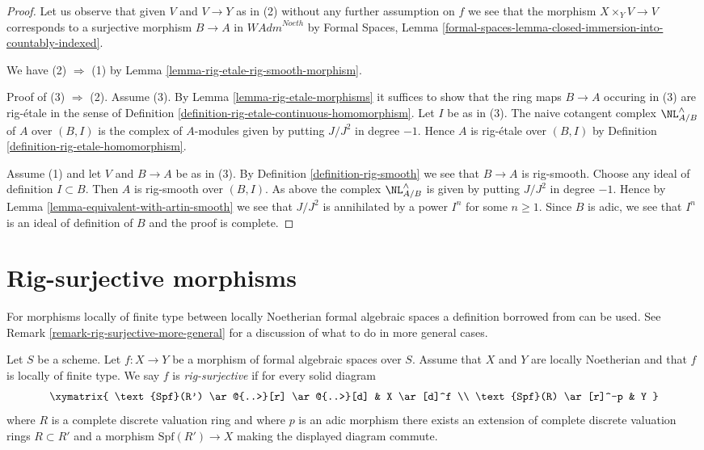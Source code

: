 \begin{proof}
Let us observe that given $V$ and $V \to Y$ as in (2) without any
further assumption on $f$ we see that the morphism $X \times_Y V \to V$
corresponds to a surjective morphism $B \to A$ in $\textit{WAdm}^{Noeth}$
by Formal Spaces, Lemma
\ref{formal-spaces-lemma-closed-immersion-into-countably-indexed}.

\medskip\noindent
We have (2) $\Rightarrow$ (1) by
Lemma \ref{lemma-rig-etale-rig-smooth-morphism}.

\medskip\noindent
Proof of (3) $\Rightarrow$ (2). Assume (3). By
Lemma \ref{lemma-rig-etale-morphisms}
it suffices to show that the ring maps
$B \to A$ occuring in (3) are rig-\'etale in the
sense of Definition \ref{definition-rig-etale-continuous-homomorphism}.
Let $I$ be as in (3). The naive cotangent complex
$\NL_{A/B}^\wedge$ of $A$ over $(B, I)$ is the complex of $A$-modules
given by putting $J/J^2$ in degree $-1$. Hence $A$ is
rig-\'etale over $(B, I)$ by
Definition \ref{definition-rig-etale-homomorphism}.

\medskip\noindent
Assume (1) and let $V$ and $B \to A$ be as in (3).
By Definition \ref{definition-rig-smooth} we see that
$B \to A$ is rig-smooth. Choose any ideal of definition $I \subset B$.
Then $A$ is rig-smooth over $(B, I)$.
As above the complex $\NL_{A/B}^\wedge$ is 
given by putting $J/J^2$ in degree $-1$.
Hence by Lemma \ref{lemma-equivalent-with-artin-smooth}
we see that $J/J^2$ is annihilated by
a power $I^n$ for some $n \geq 1$. Since $B$ is adic, we see
that $I^n$ is an ideal of definition of $B$ and the
proof is complete.
\end{proof}














\section{Rig-surjective morphisms}
\label{section-rig-surjective}

\noindent
For morphisms locally of finite type between locally Noetherian formal
algebraic spaces a definition borrowed from \cite{ArtinII} can be used. See
Remark \ref{remark-rig-surjective-more-general} for a discussion
of what to do in more general cases.

\begin{definition}
\label{definition-rig-surjective}
Let $S$ be a scheme. Let $f : X \to Y$ be a morphism of formal
algebraic spaces over $S$. Assume that $X$ and $Y$ are locally
Noetherian and that $f$ is locally of finite type. We say
$f$ is {\it rig-surjective} if for every solid diagram
$$
\xymatrix{
\text{Spf}(R') \ar@{..>}[r] \ar@{..>}[d] & X \ar[d]^f \\
\text{Spf}(R) \ar[r]^-p & Y
}
$$
where $R$ is a complete discrete valuation ring and where
$p$ is an adic morphism there exists an
extension of complete discrete valuation rings $R \subset R'$
and a morphism $\text{Spf}(R') \to X$ making the displayed diagram commute.
\end{definition}

